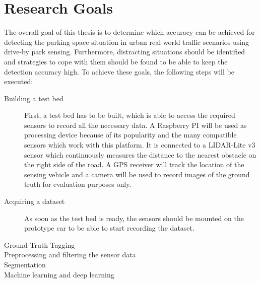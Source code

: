 





\section{Research Goals}

The overall goal of this thesis is to determine which accuracy can be achieved for detecting the parking space situation in urban real world traffic scenarios using drive-by park sensing. Furthermore, distracting situations should be identified and strategies to cope with them should be found to be able to keep the detection accuracy high. To achieve these goals, the following steps will be executed:

\begin{description}

\item[Building a test bed] First, a test bed has to be built, which is able to access the required sensors to record all the necessary data. A Raspberry PI will be used as processing device because of its popularity and the many compatible sensors which work with this platform. It is connected to a LIDAR-Lite v3 sensor which continuously measures the distance to the nearest obstacle on the right side of the road. A GPS receiver will track the location of the sensing vehicle and a camera will be used to record images of the ground truth for evaluation purposes only.

\item[Acquiring a dataset] As soon as the test bed is ready, the sensors should be mounted on the prototype car to be able to start recording the dataset. 

\item[Ground Truth Tagging]

\item[Preprocessing and filtering the sensor data]

\item[Segmentation]

\item[Machine learning and deep learning]

\end{description}






